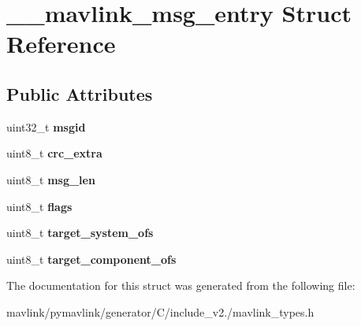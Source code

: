 \hypertarget{struct____mavlink__msg__entry}{}\section{\+\_\+\+\_\+mavlink\+\_\+msg\+\_\+entry Struct Reference}
\label{struct____mavlink__msg__entry}
\subsection*{Public Attributes}
\begin{DoxyCompactItemize}
\item 
\mbox{\label{struct____mavlink__msg__entry_a9febab81ee60dbd1a91a23a5515cad31}} 
uint32\+\_\+t {\bfseries msgid}
\item 
\mbox{\label{struct____mavlink__msg__entry_ab85eed6dcef2052cffb9093b4e2fb026}} 
uint8\+\_\+t {\bfseries crc\+\_\+extra}
\item 
\mbox{\label{struct____mavlink__msg__entry_a694a59ebf8db1111bdc87ae20e19e57d}} 
uint8\+\_\+t {\bfseries msg\+\_\+len}
\item 
\mbox{\label{struct____mavlink__msg__entry_a5dd6c81b1631f802139252c6032f0bf3}} 
uint8\+\_\+t {\bfseries flags}
\item 
\mbox{\label{struct____mavlink__msg__entry_a4c94154ed0764d8084d67270b1142dfa}} 
uint8\+\_\+t {\bfseries target\+\_\+system\+\_\+ofs}
\item 
\mbox{\label{struct____mavlink__msg__entry_a08d68ae337d99e053f02cb248a8d41b8}} 
uint8\+\_\+t {\bfseries target\+\_\+component\+\_\+ofs}
\end{DoxyCompactItemize}


The documentation for this struct was generated from the following file\+:\begin{DoxyCompactItemize}
\item 
mavlink/pymavlink/generator/\+C/include\+\_\+v2./mavlink\+\_\+types.\+h\end{DoxyCompactItemize}
